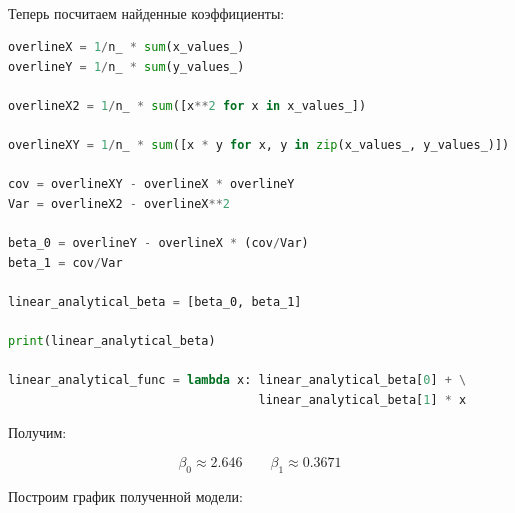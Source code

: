 \documentclass[a4paper, 14pt]{extarticle}
\begin{document}
\begin{center}
     \\
\end{center}

Теперь посчитаем найденные коэффициенты:

\begin{center}
    \begin{lstlisting}[language=Python]
overlineX = 1/n_ * sum(x_values_)
overlineY = 1/n_ * sum(y_values_)

overlineX2 = 1/n_ * sum([x**2 for x in x_values_])

overlineXY = 1/n_ * sum([x * y for x, y in zip(x_values_, y_values_)])

cov = overlineXY - overlineX * overlineY
Var = overlineX2 - overlineX**2

beta_0 = overlineY - overlineX * (cov/Var)
beta_1 = cov/Var

linear_analytical_beta = [beta_0, beta_1]

print(linear_analytical_beta)

linear_analytical_func = lambda x: linear_analytical_beta[0] + \
                                   linear_analytical_beta[1] * x
    \end{lstlisting}
\end{center}

Получим:

\begin{equation*}
    \beta_0 \approx 2.646 \qquad \beta_1 \approx 0.3671
\end{equation*}

Построим график полученной модели:
\end{document}
